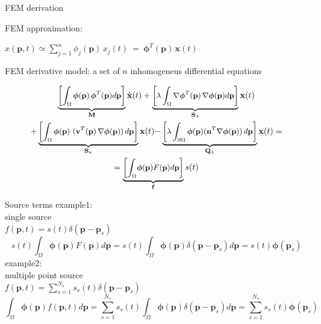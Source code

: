 \documentclass{beamer}
\newcommand{\mb}{\mathbf}
\newcommand{\bs}{\boldsymbol}
\begin{document}
\begin{frame}{FEM derivation}

FEM approximation:\\
\begin{center}

$	x(\mb{p},t) \simeq \sum_{j=1}^{n} \phi_{j}(\mb{p}) \, x_j(t) ~=~ \boldsymbol{\phi}^T(\mb{p}) \, \mb{x}(t)$

\end{center}
\vspace{0.1cm}

FEM derivative model:
a set of $n$ inhomogeneus differential equations

\begin{multline} 
\small{\underbrace{\left[ \int_\Omega  
			\bs{\phi}(\mb{p}) \,\bs{\phi}^T(\mb{p}) d\mb{p} 
			\right]}_{\mb{M}} \dot{\mb{x}}(t)  + 
		\underbrace{\left[ \lambda \int_\Omega 
			\nabla	\bs{\phi}^T(\mb{p}) \,\nabla \bs{\phi}(\mb{p}) d\mb{p} 
			\right]}_{\mb{S}_\lambda} \mb{x}(t) }\\
\small{+ \underbrace{\left[ \int_\Omega 
			\bs{\phi}(\mb{p}) ~ (\mb{v}^T(\mb{p}) \,\nabla \bs{\phi}(\mb{p}) )\, d\mb{p} 
			\right]}_{\mb{S}_\mb{v}} \mb{x}(t) }
	\small{- \underbrace{\left[ \lambda \int_{\partial \Omega} 
			 \bs{\phi}(\mb{p}) (\mb{n}^T \nabla \bs{\phi}(\mb{p})) \, d\mb{p}
			\right]}_{\mb{Q}_\lambda} \mb{x}(t) = }\\
	=  \small{\underbrace{\left[\displaystyle{\int_\Omega} \bs{\phi}(\mb{p})
			F(\mb{p}) d\mb{p}	\right]}_{\mb{f}} {s}(t) }
\end{multline} 
\end{frame}
\begin{frame}{Source terms}
example1: \\
single source\\
$f(\mb{p},t)=s(t)\delta(\mb{p}-\mb{p}_s)$\\
$$s(t)\int_\Omega \bs{\phi}(\mb{p})
			F(\mb{p}) d\mb{p} = s(t)\int_\Omega \bs{\phi}(\mb{p})
			\delta(\mb{p}-\mb{p}_s) d\mb{p}=s(t)\bs{\phi}(\mb{p}_s)$$
example2:\\
multiple point source\\
\vspace{1mm}
$f(\mb{p},t)=\sum_{s=1}^{N_s} s_s(t) \delta(\mb{p}-\mb{p}_s)$\\
$$\int_\Omega \bs{\phi}(\mb{p})
			f(\mb{p},t) d\mb{p} = \sum_{s=1}^{N_s} s_s(t) \int_\Omega \bs{\phi}(\mb{p})
			\delta(\mb{p}-\mb{p}_s) d\mb{p}= \sum_{s=1}^{N_s} s_s(t) \bs{\phi}(\mb{p}_s)$$\\
\end{frame}
\end{document}
